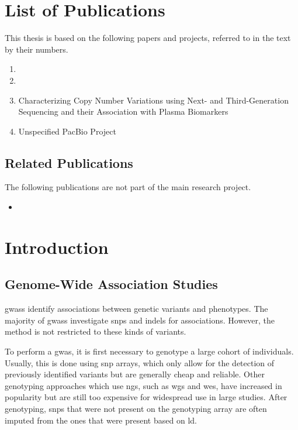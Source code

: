\documentclass[draft]{scrbook}
\begin{document}
\chapter{List of Publications}
This thesis is based on the following papers and projects, referred to in the text by their numbers.

\begin{enumerate}[label=\Roman*.]
    \item {}
    \item {}
    \item Characterizing Copy Number Variations using Next- and Third-Generation Sequencing and their Association with Plasma Biomarkers
    \item Unspecified PacBio Project
\end{enumerate}

\section*{Related Publications}
The following publications are not part of the main research project.
\begin{itemize}
    \item {}
\end{itemize}

\tableofcontents

\mainmatter
\glsresetall
\parskip 0pt
\parindent \oldparindent
\chapter{Introduction}
\section{Genome-Wide Association Studies}
\Glspl{gwas} identify associations between genetic variants and phenotypes.
The majority of \glspl{gwas} investigate \glspl{snp} and \glspl{indel} for associations.
However, the method is not restricted to these kinds of variants.

To perform a \gls{gwas}, it is first necessary to genotype a large cohort of individuals.
Usually, this is done using \gls{snp} arrays, which only allow for the detection of previously identified variants but are generally cheap and reliable.
Other genotyping approaches which use \gls{ngs}, such as \gls{wgs} and \gls{wes}, have increased in popularity but are still too expensive for widespread use in large studies.
After genotyping, \glspl{snp} that were not present on the genotyping array are often imputed from the ones that were present based on \gls{ld}.
\end{document}
